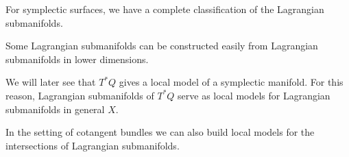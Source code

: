
For symplectic surfaces, we have a complete classification of the Lagrangian submanifolds. 

Some Lagrangian submanifolds can be constructed easily from Lagrangian submanifolds in lower dimensions.

We will later see that  $T^*Q$ gives a local model of a symplectic manifold. For this reason, Lagrangian submanifolds of $T^*Q$  serve as local models for Lagrangian submanifolds in general $X$.


In the setting of cotangent bundles we can also build local models for the intersections of Lagrangian submanifolds.
